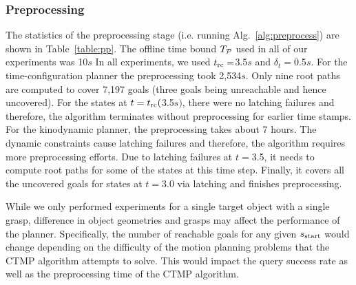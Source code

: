 \documentclass[a4paper]{report}
\begin{document}
\subsubsection{Preprocessing}
The statistics of the preprocessing stage (i.e. running Alg.~\ref{alg:preprocess}) are shown in Table~\ref{table:pp}. The offline time bound $T_{\mathcal{P}}$ used in all of our experiments was 10$s$
%
%
%
In all experiments, we used $t_{\textrm{rc}} =$3.5$s$ and $\delta_t = $0.5$s$.
%
For the time-configuration planner the preprocessing took 2,534$s$. Only nine root paths are computed to cover 7,197 goals (three goals being unreachable and hence uncovered). For the states at $t=t_{\textrm{rc}} ($3.5$s)$, there were no latching failures and therefore, the algorithm terminates without preprocessing for earlier time stamps.
%
For the kinodynamic planner, the preprocessing takes about 7 hours. The dynamic constraints cause latching failures and therefore, the algorithm requires more preprocessing efforts. Due to latching failures at $t=$3.5, it needs to compute root paths for some of the states at this time step. Finally, it covers all the uncovered goals for states at $t=$3.0 via latching and finishes preprocessing.

While we only performed experiments for a single target object with a single grasp, difference in object geometries and grasps may affect the performance of the planner. Specifically, the number of reachable goals for any given $s_{\textrm{start}}$ would change depending on the difficulty of the motion planning problems that the CTMP algorithm attempts to solve. This would impact the query success rate as well as the preprocessing time of the CTMP algorithm.
\end{document}
